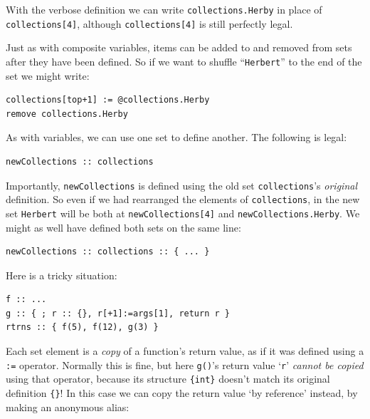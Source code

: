 \documentclass{article}
\newenvironment{code}{
       \begin{list}{}{
               \setlength{\leftmargin}{.4in}
               \setlength{\rightmargin}{0in}
               \setlength{\topsep}{.2in}
       }
       \small
       \item[] }
       { \end{list}   }
\begin{document}
\noindent With the verbose definition we can write \texttt{collections.Herby} in place of \texttt{collections[4]}, although \texttt{collections[4]} is still perfectly legal.

Just as with composite variables, items can be added to and removed from sets after they have been defined.  So if we want to shuffle ``\texttt{Herbert}'' to the end of the set we might write:

\begin{code} \begin{verbatim}
collections[top+1] := @collections.Herby
remove collections.Herby
\end{verbatim} \end{code}

As with variables, we can use one set to define another.  The following is legal:

\begin{code} \begin{verbatim}
newCollections :: collections
\end{verbatim} \end{code}

\noindent Importantly, \verb#newCollections# is defined using the old set \verb#collections#'s \emph{original} definition.  So even if we had rearranged the elements of \verb#collections#, in the new set \verb#Herbert# will be both at \verb#newCollections[4]# and \verb#newCollections.Herby#.  We might as well have defined both sets on the same line:

\begin{code} \begin{verbatim}
newCollections :: collections :: { ... }
\end{verbatim} \end{code}

Here is a tricky situation:

\begin{code} \begin{verbatim}
f :: ...
g :: { ; r :: {}, r[+1]:=args[1], return r }
rtrns :: { f(5), f(12), g(3) }
\end{verbatim} \end{code}

\noindent Each set element is a \emph{copy} of a function's return value, as if it was defined using a \verb#:=# operator.  Normally this is fine, but here \verb#g()#'s return value `\verb#r#' \emph{cannot be copied} using that operator, because its structure \verb#{int}# doesn't match its original definition \verb#{}#!  In this case we can copy the return value `by reference' instead, by making an anonymous alias:
\end{document}
